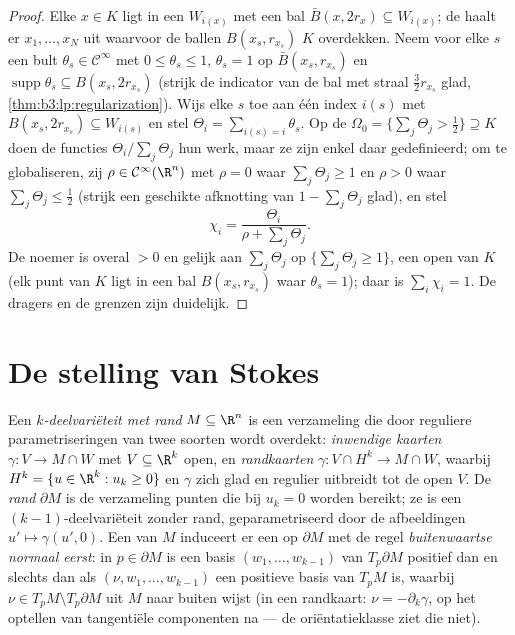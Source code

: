 \begin{proof}
Elke $x \in K$ ligt in een $W_{i(x)}$ met een  bal $\bar
B(x, 2r_x) \subseteq W_{i(x)}$; de  haalt er $x_1,
\dots, x_N$ uit waarvoor de ballen $B(x_s, r_{x_s})$ $K$
overdekken. Neem voor elke $s$ een bult $\theta_s \in \mathcal
C^\infty$ met $0 \leq \theta_s \leq 1$, $\theta_s = 1$ op $\bar
B(x_s, r_{x_s})$ en $\operatorname{supp}\theta_s \subseteq B(x_s,
2r_{x_s})$ (strijk de indicator van de bal met straal
$\frac32r_{x_s}$ glad, \cref{thm:b3:lp:regularization}). Wijs
elke $s$ toe aan één index $i(s)$ met $B(x_s, 2r_{x_s})
\subseteq W_{i(s)}$ en stel $\Theta_i = \sum_{i(s) = i}\theta_s$.
Op de  $\Omega_0 = \{\sum_j\Theta_j >
\tfrac12\} \supseteq K$ doen de functies
$\Theta_i/\sum_j\Theta_j$ hun werk, maar ze zijn enkel daar
gedefinieerd; om te globaliseren, zij $\rho \in \mathcal
C^\infty(\R^n)$ met $\rho = 0$ waar $\sum_j\Theta_j \geq 1$ en
$\rho > 0$ waar $\sum_j\Theta_j \leq \tfrac12$ (strijk een
geschikte afknotting van $1 - \sum_j\Theta_j$ glad), en stel
\[
\chi_i = \frac{\Theta_i}{\rho + \sum_j\Theta_j} .
\]
De noemer is overal $> 0$ en gelijk aan $\sum_j\Theta_j$ op
$\{\sum_j\Theta_j \geq 1\}$, een open  van $K$ (elk punt
van $K$ ligt in een bal $B(x_s, r_{x_s})$ waar $\theta_s = 1$);
daar is $\sum_i\chi_i = 1$. De dragers en de grenzen zijn
duidelijk.
\end{proof}

\section{De stelling van Stokes}

\begin{definition}\label{def:b3:forms:boundary}
Een \emph{$k$-deelvariëteit met rand} $M \subseteq \R^n$ is een verzameling die door reguliere
parametriseringen van twee soorten wordt overdekt: \emph{inwendige
kaarten} $\gamma\colon V \to M \cap W$ met $V \subseteq \R^k$
open, en \emph{randkaarten} $\gamma\colon V \cap H^k \to M \cap
W$, waarbij $H^k = \{u \in \R^k : u_k \geq 0\}$ en $\gamma$ zich
glad en regulier uitbreidt tot de open $V$. De \emph{rand}
$\partial M$ is de verzameling punten die bij $u_k = 0$ worden
bereikt; ze is een $(k-1)$-deelvariëteit zonder rand,
geparametriseerd door de afbeeldingen $u' \mapsto \gamma(u', 0)$.
Een  van $M$ induceert er een op $\partial M$ met de
regel \emph{buitenwaartse normaal eerst}: in $p \in \partial M$
is een basis $(w_1, \dots, w_{k-1})$ van $T_p\partial M$ positief
dan en slechts dan als $(\nu, w_1, \dots, w_{k-1})$ een positieve
basis van $T_pM$ is, waarbij $\nu \in T_pM \setminus T_p\partial
M$ uit $M$ naar buiten wijst (in een randkaart: $\nu =
-\partial_k\gamma$, op het optellen van tangentiële componenten
na --- de oriëntatieklasse ziet die niet).
\end{definition}

